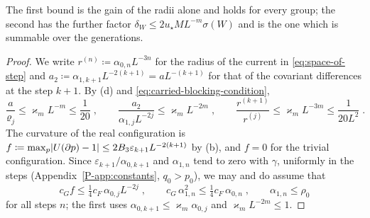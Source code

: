 The first bound is the gain of the radii alone and holds for every group; the second has the further factor $\delta_W \leq 2u_\star ML^{-m}\sigma(W)$ and is the one which is summable over the generations.

\begin{proof}
We write $r^{(n)} \coloneqq \alpha_{0,n}L^{-3n}$ for the radius of the current in \eqref{eq:space-of-step} and $a_2 \coloneqq \alpha_{1,k+1}L^{-2(k+1)} = aL^{-(k+1)}$ for that of the covariant differences at the step $k + 1$. By (d) and \eqref{eq:carried-blocking-condition},
\begin{equation}\label{eq:carried-ratios}
    \frac{a}{\varrho_j} \leq \varkappa_mL^{-m} \leq \frac{1}{20}\;,
    \qquad
    \frac{a_2}{\alpha_{1,j}L^{-2j}} \leq \varkappa_mL^{-2m}\;,
    \qquad
    \frac{r^{(k+1)}}{r^{(j)}} \leq \varkappa_mL^{-3m} \leq \frac{1}{20L^2}\;.
\end{equation}
The curvature of the real configuration is $f \coloneqq \max_p\lvert U(\partial p) - 1\rvert \leq 2B_3\varepsilon_{k+1}L^{-2(k+1)}$ by (b), and $f = 0$ for the trivial configuration. Since $\varepsilon_{k+1}/\alpha_{0,k+1}$ and $\alpha_{1,n}$ tend to zero with $\gamma$, uniformly in the steps (Appendix~\ref{P-app:constants}, $q_0 > p_0$), we may and do assume that
\begin{equation}\label{eq:carried-smallness}
    c_Gf \leq \tfrac14c_F\,\alpha_{0,j}L^{-2j}\;,
    \qquad
    c_G\,\alpha_{1,n}^2 \leq \tfrac14c_F\,\alpha_{0,n}\;,
    \qquad
    \alpha_{1,n} \leq \rho_0
\end{equation}
for all steps $n$; the first uses $\alpha_{0,k+1} \leq \varkappa_m\alpha_{0,j}$ and $\varkappa_mL^{-2m} \leq 1$.


\end{proof}
